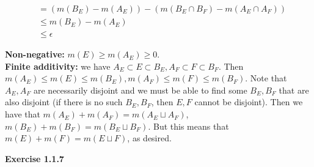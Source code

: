\documentclass[answers,12pt]{exam}
\begin{document}
\begin{solution}
\begin{itemize}
\[\begin{aligned}
            &= (m(B_E)-m(A_E))-(m(B_E \cap B_F)-m(A_E \cap A_F)) \\
            &\leq m(B_E)-m(A_E)\\
            &\leq \epsilon
        \end{aligned}
    \]
\end{itemize}
\textbf{Non-negative:} $m(E) \geq m(A_E) \geq 0$.\\
\textbf{Finite additivity:} we have $A_E \subset E \subset B_E, A_F \subset F \subset B_F$. 
Then $m(A_E) \leq m(E) \leq m(B_E), m(A_F) \leq m(F) \leq m(B_F)$. 
Note that $A_E, A_F$ are necessarily disjoint and we must be able to find some $B_E, B_F$ that are also disjoint (if there is no such $B_E, B_F$, then $E,F$ cannot be disjoint).
Then we have that $m(A_E)+m(A_F) = m(A_E \sqcup A_F)$, $ m(B_E)+m(B_F) = m(B_E \sqcup B_F)$. But this means that $m(E)+m(F)=m(E \sqcup F)$, as desired. 
\end{solution}
\textbf{Exercise 1.1.7}
\end{document}
